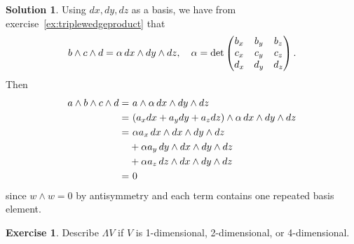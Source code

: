 \documentclass[11pt, a4paper]{report}
\theoremstyle{definition}
\newtheorem{exercise}{Exercise}[part]
\newtheorem{solution}{Solution}[part]
\newenvironment{ex}{\begin{exercise}}{\end{exercise}\pagebreak[1]}
\newenvironment{sol}{\begin{solution}}{\end{solution}\pagebreak[3]}
\newcommand*{\op}[1]{\ensuremath\mathop{}\mathopen{}#1}
\renewcommand*{\d}{\op{d}}
\begin{document}
\begin{sol}

Using $dx, dy, dz$ as a basis, we have from exercise~\ref{ex:triplewedgeproduct} that
\[
    b \wedge c \wedge d = \alpha \d x \wedge dy \wedge dz, \quad
    \alpha = \det \begin{pmatrix}
        b_x & b_y & b_z \\
        c_x & c_y & c_z \\
        d_x & d_y & d_z
    \end{pmatrix}.
\]
Then
\begin{align*}
    a \wedge b \wedge c \wedge d =&\ a \wedge \alpha \d x \wedge dy \wedge dz \\
        =&\ (a_x dx + a_y dy + a_z dz) \wedge \alpha \d x \wedge dy \wedge dz \\
        =&\ \alpha a_x \d x \wedge dx \wedge dy \wedge dz \\
        &+ \alpha a_y \d y \wedge dx \wedge dy \wedge dz \\
        &+ \alpha a_z \d z \wedge dx \wedge dy \wedge dz \\
        =&\ 0
\end{align*}
since $w \wedge w = 0$ by antisymmetry and each term contains one repeated basis element.

\end{sol}

\begin{ex}

Describe $\Lambda V$ if $V$ is 1-dimensional, 2-dimensional, or 4-dimensional.

\end{ex}
\end{document}
